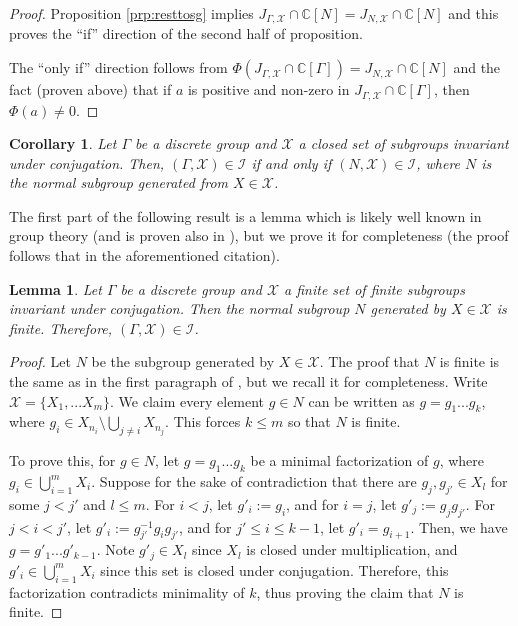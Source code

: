\documentclass[a4paper, 12pt]{amsart}
\newtheorem{cor}[thm]{Corollary}
\newtheorem{lem}[thm]{Lemma}
\theoremstyle{definition}
\theoremstyle{remark}
\numberwithin{equation}{section}
\begin{document}
\begin{proof}
Proposition \ref{prp:resttosg} implies $J_{\Gamma,\mathcal{X}}\cap \mathbb{C}[N] = J_{N,\mathcal{X}}\cap\mathbb{C}[N]$ and this proves the ``if'' direction of the second half of proposition.

The ``only if'' direction follows from $\Phi(J_{\Gamma,\mathcal{X}}\cap\mathbb{C}[\Gamma]) = J_{N,\mathcal{X}}\cap \mathbb{C}[N]$ and the fact (proven above) that if $a$ is positive and non-zero in $J_{\Gamma,\mathcal{X}}\cap\mathbb{C}[\Gamma]$, then $\Phi(a)\neq 0$.
\end{proof}

\begin{cor}
\label{cor:redtonsg}
    Let $\Gamma$ be a discrete group and $\mathcal{X}$ a closed set of subgroups invariant under conjugation. Then, $(\Gamma, \mathcal{X})\in \mathcal{I}$ if and only if $(N,\mathcal{X})\in\mathcal{I}$, where $N$ is the normal subgroup generated from $X\in\mathcal{X}$.
\end{cor}

The first part of the following result is a lemma which is likely well known in group theory (and is proven also in \cite[Theorem~4.7]{BGHL25}), but we prove it for completeness (the proof follows that in the aforementioned citation).

\begin{lem}
\label{lem:finite}
Let $\Gamma$ be a discrete group and $\mathcal{X}$ a finite set of finite subgroups invariant under conjugation. Then the normal subgroup $N$ generated by $X\in\mathcal{X}$ is finite. Therefore, $(\Gamma,\mathcal{X})\in\mathcal{I}$.
\end{lem}

\begin{proof}
    Let $N$ be the subgroup generated by $X\in\mathcal{X}$. The proof that $N$ is finite is the same as in the first paragraph of \cite[Theorem~4.7]{BGHL25}, but we recall it for completeness. Write $\mathcal{X} = \{X_{1},...X_{m}\}$. We claim every element $g\in N$ can be written as $g = g_{1}...g_{k}$, where $g_{i}\in X_{n_{i}}\setminus\bigcup_{j\neq i}X_{n_{j}}$. This forces $k\leq m$ so that $N$ is finite.
    
    To prove this, for $g\in N$, let $g = g_{1}...g_{k}$ be a minimal factorization of $g$, where $g_{i}\in \bigcup^{m}_{i=1}X_{i}$. Suppose for the sake of contradiction that there are $g_{j}, g_{j'}\in X_{l}$ for some $j < j'$ and $l\leq m$. For $i < j$, let $g'_{i} := g_{i}$, and for $i = j$, let $g'_{j}:= g_{j}g_{j'}$. For $j <i< j'$, let $g'_{i}:= g^{-1}_{j'}g_{i}g_{j'}$, and for $j'\leq i\leq k-1$, let $g'_{i} = g_{i+1}$. Then, we have $g = g'_{1}...g'_{k-1}$. Note $g'_{j}\in X_{l}$ since $X_{l}$ is closed under multiplication, and $g'_{i}\in \bigcup^{m}_{i=1}X_{i}$ since this set is closed under conjugation. Therefore, this factorization contradicts minimality of $k$, thus proving the claim that $N$ is finite.
\end{proof}
\end{document}
